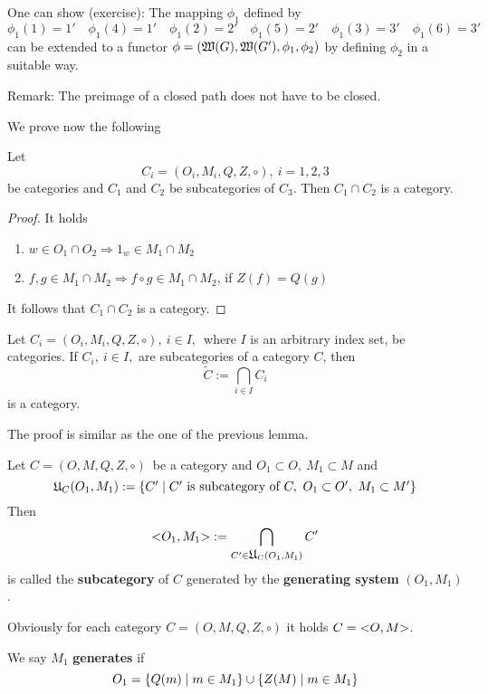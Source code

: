 One can show (exercise): The mapping $\phi_1$ defined by 
\[ \phi_1(1) = 1' \quad \phi_1(4) = 1' \quad \phi_1(2) = 2' \quad \phi_1(5) = 2'
 \quad \phi_1(3) = 3' \quad \phi_1(6) = 3' \]
can be extended to a functor $\phi = (\mbox{$\mathfrak{W}(G)$}, \mbox{$\mathfrak{W}(G')$}, \phi_1,
\phi_2)$ by defining $\phi_2$ in a suitable way.

Remark: The preimage of a closed path does not have to be closed.

We prove now the following
\begin{lemma}
Let \[ C_i = (O_i, M_i, Q, Z, \circ),\ i = 1, 2, 3 \] be categories and $C_1$
and $C_2$ be subcategories of $C_3$. Then $C_1 \cap C_2$ is a category.
\end{lemma}

\begin{proof}
It holds
\begin{enumerate}
  \item $w \in O_1 \cap O_2 \Rightarrow 1_w \in M_1 \cap M_2$
  \item $f, g \in M_1 \cap M_2 \Rightarrow f \circ g \in M_1 \cap M_2$, if
  $Z(f) = Q(g)$
\end{enumerate}
It follows that $C_1 \cap C_2$ is a category.
\end{proof}

\bigskip
\begin{lemma}
Let $ C_i = (O_i, M_i, Q, Z, \circ),\ i \in I,$\ where $I$ is an arbitrary
index set, be categories. If $C_i,\ i \in I,$ are subcategories of a category
$C$, then 
\[ \tilde{C} := \bigcap_{i \in I} C_i \] 
is a category.
\end{lemma}
The proof is similar as the one of the previous lemma.

\bigskip
\begin{definition}
Let $C = (O, M, Q, Z, \circ)$\ be a category and $O_1 \subset O,\ M_1 \subset M$
and 
\[ \mbox{$\mathfrak{U}$}_C(O_1, M_1) := \mbox{$\{C' \mid C'\text{ is subcategory of }C,\
O_1 \subset O',\ M_1 \subset M'\}$} \]
Then 
\[ \mbox{${<}O_1,M_1{>}$} := \bigcap_{C' \in \mbox{$\mathfrak{U}$}_C(O_1, M_1)} C' \]
is called the {\bf subcategory} of $C$ generated by the {\bf generating system}
$(O_1, M_1)$.
\end{definition}

Obviously for each category $C = (O, M, Q, Z, \circ)$ it holds $C =
\mbox{${<}O,M{>}$}$.

We say $M_1$ {\bf generates}  if 
\[ O_1 = \mbox{$\{Q(m) \mid m \in M_1\}$} \cup \mbox{$\{Z(M) \mid m \in M_1\}$} \]

